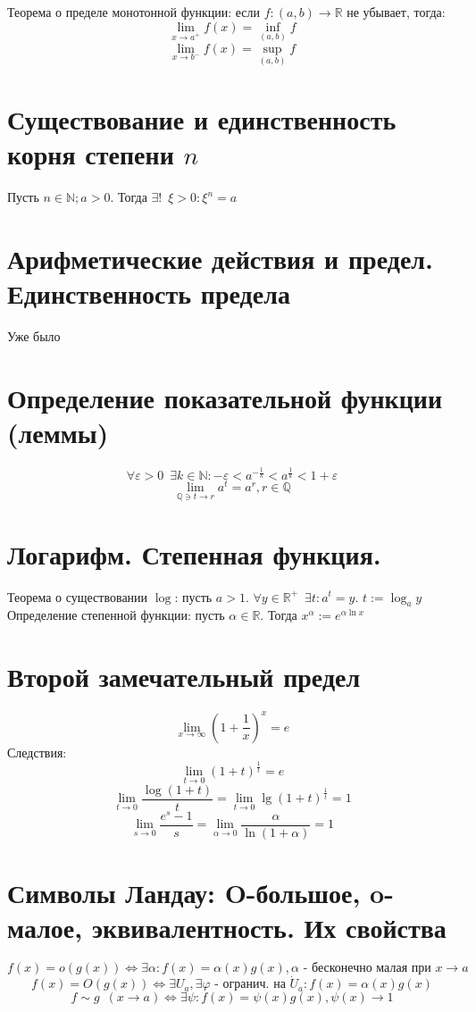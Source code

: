\documentclass[11pt, a4paper, utf-8]{article}
\def\R{\mathbb{R}}
\def\Q{\mathbb{Q}}
\def\N{\mathbb{N}}
\def\sp{\, \, \,}
\begin{document}
    Теорема о пределе монотонной функции: если $f : (a,b) \to \R$ не убывает, тогда:
    $$\lim_{x \to a^+} f(x) = \inf \limits_{(a,b)} f$$
    $$\lim_{x \to b^-} f(x) = \sup \limits_{(a,b)} f$$

    \section{Существование и единственность корня степени $n$}
    Пусть $n \in \N; a > 0$. Тогда $\exists ! \sp \xi > 0 : \xi ^n = a$

    \section{Арифметические действия и предел. Единственность предела}
    Уже было

    \section{Определение показательной функции (леммы)}
    $$\forall \varepsilon > 0 \sp \exists k \in \N : -\varepsilon < a^{-\frac{1}{k}} < a^{\frac{1}{k}} < 1 + \varepsilon$$
    $$\lim_{\Q \ni t \to r} a^t = a^r , r \in \Q$$

    \section{Логарифм. Степенная функция.}
    Теорема о существовании $\log$: пусть $a > 1$. $\forall y \in \R^+ \sp \exists t: a^t = y$. $t := \log_a y$\\
    Определение степенной функции: пусть $\alpha \in \R$. Тогда $x^{\alpha} := e^{\alpha \ln x}$

    \section{Второй замечательный предел}
    $$\lim_{x \to \infty} \left(1 + \frac{1}{x}\right)^x = e$$
    Следствия:
    $$\lim_{t \to 0} (1+t)^{\frac{1}{t}} = e$$
    $$\lim_{t \to 0} \frac{\log (1+t)}{t} = \lim_{t \to 0} \lg (1+t)^{\frac{1}{t}} = 1$$
    $$\lim_{s \to 0} \frac{e^s - 1}{s} = \lim_{\alpha \to 0} \frac{\alpha}{\ln (1 + \alpha)} = 1$$

    \section{Символы Ландау: O-большое, o-малое, эквивалентность. Их свойства}
    $$f(x) = o(g(x)) \iff \exists \alpha : f(x) = \alpha (x) g(x), \alpha \text{ - бесконечно малая при } x \to a$$
    $$f(x) = O(g(x)) \iff \exists U_a, \exists \varphi \text{ - огранич. на } \dot{U}_a : f(x) = \alpha (x) g(x)$$
    $$f \sim g \sp (x \to a) \iff \exists \psi : f(x) = \psi (x) g(x), \psi (x) \to 1$$
\end{document}
